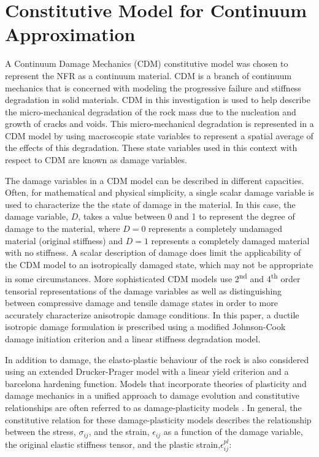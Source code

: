 \section{Constitutive Model for Continuum Approximation}

A Continuum Damage Mechanics (CDM) constitutive model was chosen to represent the NFR as a continuum material. CDM is a branch of continuum mechanics that is concerned with modeling the progressive failure and stiffness degradation in solid materials. CDM in this investigation is used to help describe the micro-mechanical degradation of the rock mass due to the nucleation and growth of cracks and voids. This micro-mechanical degradation is represented in a CDM model by using macroscopic state variables to represent a spatial average of the effects of this degradation. These state variables used in this context with respect to CDM are known as damage variables. 

The damage variables in a CDM model can be described in different capacities. Often, for mathematical and physical simplicity, a single scalar damage variable is used to characterize the the state of damage in the material. In this case, the damage variable, $D$, takes a value between 0 and 1 to represent the degree of damage to the material, where $D=0$ represents a completely undamaged material (original stiffness) and $D=1$ represents a completely damaged material with no stiffness. A scalar description of damage does limit the applicability of the CDM model to an isotropically damaged state, which may not be appropriate in some circumstances. More sophisticated CDM models use 2\textsuperscript{nd} and 4\textsuperscript{th} order tensorial representations of the damage variables as well as distinguishing between compressive damage and tensile damage states in order to more accurately characterize anisotropic damage conditions. In this paper, a ductile isotropic damage formulation is prescribed using a modified Johnson-Cook damage initiation criterion and a linear stiffness degradation model.

In addition to damage, the elasto-plastic behaviour of the rock is also considered using an extended Drucker-Prager model with a linear yield criterion and a barcelona hardening function. Models that incorporate theories of plasticity and damage mechanics in a unified approach to damage evolution and constitutive relationships are often referred to as damage-plasticity models \cite{zhang_continuum_2010}. In general, the constitutive relation for these damage-plasticity models describes the relationship between the stress, $\sigma_{ij}$, and the strain, $\epsilon_{ij}$ as a function of the damage variable, the original elastic stiffness tensor, and the plastic strain,$\epsilon^{pl}_{ij}$: 

